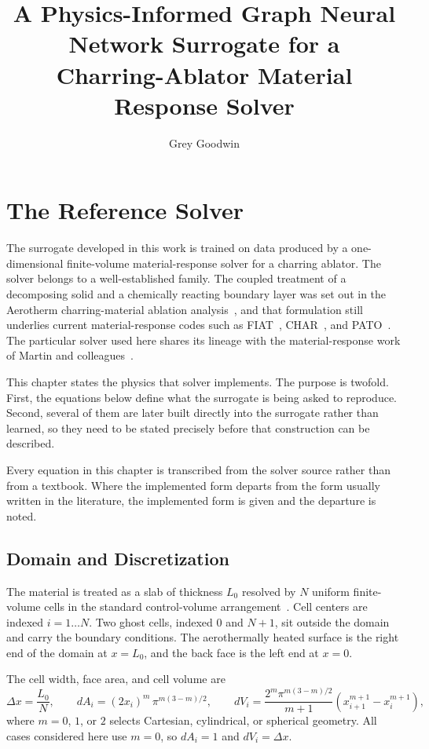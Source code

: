\documentclass[11pt]{report}
\title{A Physics-Informed Graph Neural Network Surrogate for a\\
Charring-Ablator Material Response Solver}
\author{Grey Goodwin}
\date{}
\begin{document}
\maketitle

\chapter{The Reference Solver}

The surrogate developed in this work is trained on data produced by a
one-dimensional finite-volume material-response solver for a charring ablator.
The solver belongs to a well-established family. The coupled treatment of a
decomposing solid and a chemically reacting boundary layer was set out in the
Aerotherm charring-material ablation analysis~\cite{kendall1968part1,moyer1968cma},
and that formulation still underlies current material-response codes such as
FIAT~\cite{chen1999fiat}, CHAR~\cite{amar2016char}, and
PATO~\cite{lachaud2014pato}. The particular solver used here shares its lineage
with the material-response work of Martin and
colleagues~\cite{martin2010nondarcian,weng2014pyrolysisgas,martin2015coupled}.

This chapter states the physics that solver implements. The purpose is twofold.
First, the equations below define what the surrogate is being asked to reproduce.
Second, several of them are later built directly into the surrogate rather than
learned, so they need to be stated precisely before that construction can be
described.

Every equation in this chapter is transcribed from the solver source rather than
from a textbook. Where the implemented form departs from the form usually written
in the literature, the implemented form is given and the departure is noted.

\section{Domain and Discretization}

The material is treated as a slab of thickness $L_0$ resolved by $N$ uniform
finite-volume cells in the standard control-volume
arrangement~\cite{patankar1980,versteeg2007fvm}. Cell centers are indexed
$i = 1 \dots N$. Two ghost cells,
indexed $0$ and $N+1$, sit outside the domain and carry the boundary conditions.
The aerothermally heated surface is the right end of the domain at $x = L_0$, and
the back face is the left end at $x = 0$.

The cell width, face area, and cell volume are
\begin{equation}
\Delta x = \frac{L_0}{N}, \qquad
dA_i = (2x_i)^{m}\,\pi^{m(3-m)/2}, \qquad
dV_i = \frac{2^{m}\pi^{m(3-m)/2}}{m+1}\left(x_{i+1}^{m+1} - x_i^{m+1}\right),
\end{equation}
where $m = 0$, $1$, or $2$ selects Cartesian, cylindrical, or spherical geometry.
All cases considered here use $m = 0$, so $dA_i = 1$ and $dV_i = \Delta x$.
\end{document}
